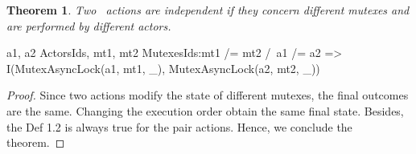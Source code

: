 \documentclass[a4paper,11pt]{article}
\theoremstyle{break}
\newtheorem{theorem}{Theorem}[section]
\begin{document}
\begin{theorem}
\label{theorem6}
Two \mutexlock~actions are independent if they concern different mutexes and are performed by different actors.
\end{theorem}
\begin{tla}
\forall a1, a2 \in ActorsIds, mt1, mt2 \in MutexesIds:mt1 /= mt2 /\ a1 /= a2
	=>	I(MutexAsyncLock(a1, mt1, _), MutexAsyncLock(a2, mt2, _))
\end{tla}
\begin{tlatex}
\end{tlatex}

\begin{proof}
		Since two actions modify the state of different mutexes, the final outcomes are the same. Changing the execution order obtain the same final state. Besides, the Def 1.2 is always true for the pair actions. Hence, we conclude the theorem. 
\end{proof}
\end{document}
